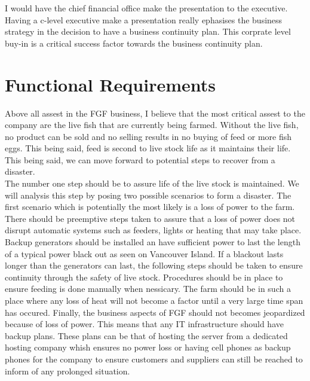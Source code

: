 \documentclass[paper=a4, fontsize=11pt]{scrartcl} %
\numberwithin{equation}{section} %
\numberwithin{figure}{section} %
\numberwithin{table}{section} %
\begin{document}
I would have the chief financial office make the presentation to the executive. Having
a c-level executive make a presentation really ephasises the business strategy in the
decision to have a business continuity plan. This corprate level buy-in is a critical
success factor towards the business continuity plan.



\section{Functional Requirements}

Above all assest in the FGF business, I believe that the most critical assest to the company
are the live fish that are currently being farmed. Without the live fish, no product can be
sold and no selling results in no buying of feed or more fish eggs. This being said, feed is
second to live stock life as it maintains their life. This being said, we can move forward to
potential steps to recover from a disaster.\\

The number one step should be to assure life of the live stock is maintained. We will analysis
this step by posing two possible scenarios to form a disaster. The first scenario which is
potentially the most likely is a loss of power to the farm. There should be preemptive steps
taken to assure that a loss of power does not disrupt automatic systems such as feeders, lights
or heating that may take place. Backup generators should be installed an have sufficient power
to last the length of a typical power black out as seen on Vancouver Island. If a blackout lasts
longer than the generators can last, the following steps should be taken to ensure continuity
through the safety of live stock. Procedures should be in place to ensure feeding is done manually
when nessicary. The farm should be in such a place where any loss of heat will not become a factor
until a very large time span has occured. Finally, the business aspects of FGF should not becomes
jeopardized because of loss of power. This means that any IT infrastructure should have backup
plans. These plans can be that of hosting the server from a dedicated hosting company whish ensures
no power loss or having cell phones as backup phones for the company to ensure customers and suppliers
can still be reached to inform of any prolonged situation.\\
\end{document}
